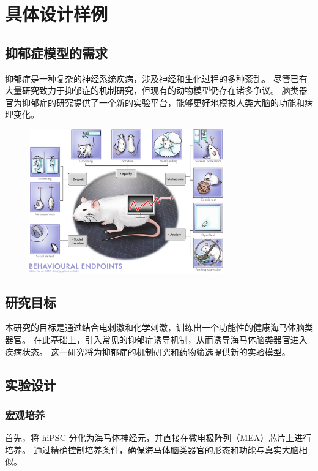 \chapter{具体设计样例}\label{chap:design}

\section{抑郁症模型的需求}\label{sec:depression-model-requirement}
抑郁症是一种复杂的神经系统疾病，涉及神经和生化过程的多种紊乱。
尽管已有大量研究致力于抑郁症的机制研究，但现有的动物模型仍存在诸多争议\cite{yan2010behavioral}。
脑类器官为抑郁症的研究提供了一个新的实验平台，能够更好地模拟人类大脑的功能和病理变化。

\begin{figure}[!htbp]
    \centering
    \includegraphics[width=0.75\textwidth]{Img/depression-model.png}
    \label{fig:depression-model}
\end{figure}

\section{研究目标}\label{sec:research-objective}
本研究的目标是通过结合电刺激和化学刺激，训练出一个功能性的健康海马体脑类器官。
在此基础上，引入常见的抑郁症诱导机制，从而诱导海马体脑类器官进入疾病状态。
这一研究将为抑郁症的机制研究和药物筛选提供新的实验模型。


\section{实验设计}\label{sec:experiment-design}
\subsection{宏观培养}\label{subsec:macro-culture}
首先，将 hiPSC 分化为海马体神经元\cite{Wu2024}，并直接在微电极阵列（MEA）芯片上进行培养。
通过精确控制培养条件，确保海马体脑类器官的形态和功能与真实大脑相似。

